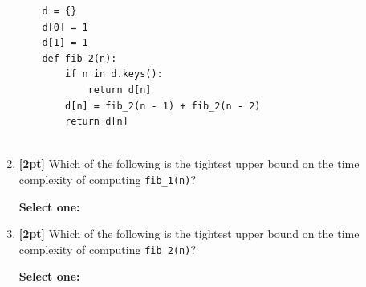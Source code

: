 \documentclass[12pt]{article}
\renewcommand{\circle}{\tikz\draw[black] (0,0) circle (1ex);}
\begin{document}
\begin{enumerate}
\begin{lstlisting}
    d = {}
    d[0] = 1
    d[1] = 1
    def fib_2(n):
        if n in d.keys():
            return d[n]
        d[n] = fib_2(n - 1) + fib_2(n - 2)
        return d[n]
        
    \end{lstlisting}
    
    \item \textbf{[2pt]} Which of the following is the tightest upper bound on the time complexity of computing \lstinline{fib_1(n)}? 

    \textbf{Select one:}


    
    \item \textbf{[2pt]} Which of the following is the tightest upper bound on the time complexity of computing \lstinline{fib_2(n)}? 

    \textbf{Select one:}


    
    
    
    

    \clearpage
\end{enumerate}

\clearpage
\end{document}
